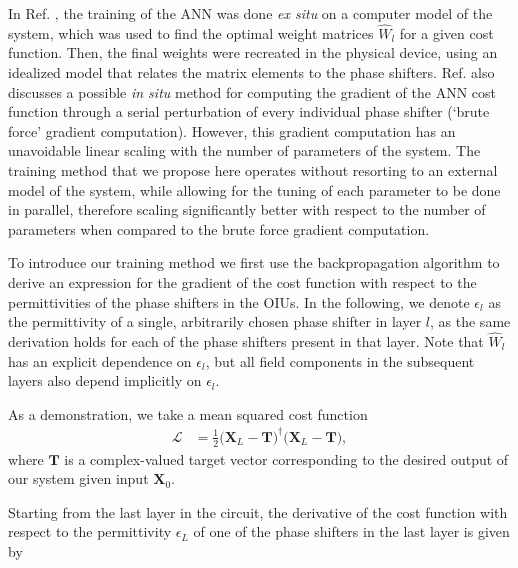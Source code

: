 In Ref. \cite{Shen2017}, the training of the ANN was done \textit{ex situ} on a computer model of the system, which was used to find the optimal weight matrices $\hat{W}_l$ for a given cost function. Then, the final weights were recreated in the physical device, using an idealized model that relates the matrix elements to the phase shifters. Ref. \cite{Shen2017} also discusses a possible \textit{in situ} method for computing the gradient of the ANN cost function through a serial perturbation of every individual phase shifter (`brute force' gradient computation). However, this gradient computation has an unavoidable linear scaling with the number of parameters of the system.  The training method that we propose here operates without resorting to an external model of the system, while allowing for the tuning of each parameter to be done in parallel, therefore scaling significantly better with respect to the number of parameters when compared to the brute force gradient computation.

To introduce our training method we first use the backpropagation algorithm to derive an expression for the gradient of the cost function with respect to the permittivities of the phase shifters in the OIUs. In the following, we denote $\epsilon_l$ as the permittivity of a single, arbitrarily chosen phase shifter in layer $l$, as the same derivation holds for each of the phase shifters present in that layer.  Note that $\hat{W}_l$ has an explicit dependence on $\epsilon_l$, but all field components in the subsequent layers also depend implicitly on $\epsilon_l$.

As a demonstration, we take a mean squared cost function
\begin{align}
\mathcal{L} &= \frac{1}{2}\big(\mathbf{X}_L -\mathbf{T} \big)^\dagger \big( \mathbf{X}_L -\mathbf{T} \big),
\label{eq:NN_forward}
\end{align}
where $\mathbf{T}$ is a complex-valued target vector corresponding to the desired output of our system given input $\mathbf{X}_0$.

Starting from the last layer in the circuit, the derivative of the cost function with respect to the permittivity $\epsilon_L$ of one of the phase shifters in the last layer is given by

